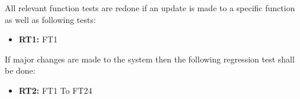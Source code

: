 \documentclass{article}
\begin{document}
		\begin{flushleft}
		All relevant function tests are redone if an update is made to a specific function as well as following tests:
		\end{flushleft}
		
		\begin{itemize}
		
  			\item \textbf{RT1:} FT1
  			
			  					
		\end{itemize}
		
		\begin{flushleft}
			If major changes are made to the system then the following regression test shall be done:
			\end{flushleft}	
		
		\begin{itemize}			
  			
  			\item \textbf{RT2:} FT1 To FT24			

		\end{itemize}
		
		
			
		


\end{document}
